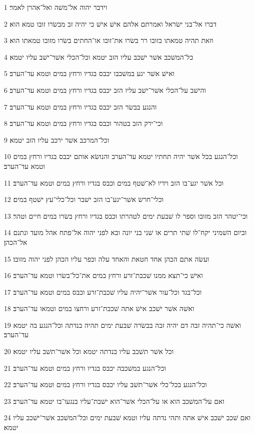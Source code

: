 \par 1 וידבר יהוה אל־משׁה ואל־אהרן לאמר׃
\par 2 דברו אל־בני ישׂראל ואמרתם אלהם אישׁ אישׁ כי יהיה זב מבשׂרו זובו טמא הוא׃
\par 3 וזאת תהיה טמאתו בזובו רר בשׂרו את־זובו או־החתים בשׂרו מזובו טמאתו הוא׃
\par 4 כל־המשׁכב אשׁר ישׁכב עליו הזב יטמא וכל־הכלי אשׁר־ישׁב עליו יטמא׃
\par 5 ואישׁ אשׁר יגע במשׁכבו יכבס בגדיו ורחץ במים וטמא עד־הערב׃
\par 6 והישׁב על־הכלי אשׁר־ישׁב עליו הזב יכבס בגדיו ורחץ במים וטמא עד־הערב׃
\par 7 והנגע בבשׂר הזב יכבס בגדיו ורחץ במים וטמא עד־הערב׃
\par 8 וכי־ירק הזב בטהור וכבס בגדיו ורחץ במים וטמא עד־הערב׃
\par 9 וכל־המרכב אשׁר ירכב עליו הזב יטמא׃
\par 10 וכל־הנגע בכל אשׁר יהיה תחתיו יטמא עד־הערב והנושׂא אותם יכבס בגדיו ורחץ במים וטמא עד־הערב׃
\par 11 וכל אשׁר יגע־בו הזב וידיו לא־שׁטף במים וכבס בגדיו ורחץ במים וטמא עד־הערב׃
\par 12 וכלי־חרשׂ אשׁר־יגע־בו הזב ישׁבר וכל־כלי־עץ ישׁטף במים׃
\par 13 וכי־יטהר הזב מזובו וספר לו שׁבעת ימים לטהרתו וכבס בגדיו ורחץ בשׂרו במים חיים וטהר׃
\par 14 וביום השׁמיני יקח־לו שׁתי תרים או שׁני בני יונה ובא לפני יהוה אל־פתח אהל מועד ונתנם אל־הכהן׃
\par 15 ועשׂה אתם הכהן אחד חטאת והאחד עלה וכפר עליו הכהן לפני יהוה מזובו׃
\par 16 ואישׁ כי־תצא ממנו שׁכבת־זרע ורחץ במים את־כל־בשׂרו וטמא עד־הערב׃
\par 17 וכל־בגד וכל־עור אשׁר־יהיה עליו שׁכבת־זרע וכבס במים וטמא עד־הערב׃
\par 18 ואשׁה אשׁר ישׁכב אישׁ אתה שׁכבת־זרע ורחצו במים וטמאו עד־הערב׃
\par 19 ואשׁה כי־תהיה זבה דם יהיה זבה בבשׂרה שׁבעת ימים תהיה בנדתה וכל־הנגע בה יטמא עד־הערב׃
\par 20 וכל אשׁר תשׁכב עליו בנדתה יטמא וכל אשׁר־תשׁב עליו יטמא׃
\par 21 וכל־הנגע במשׁכבה יכבס בגדיו ורחץ במים וטמא עד־הערב׃
\par 22 וכל־הנגע בכל־כלי אשׁר־תשׁב עליו יכבס בגדיו ורחץ במים וטמא עד־הערב׃
\par 23 ואם על־המשׁכב הוא או על־הכלי אשׁר־הוא ישׁבת־עליו בנגעו־בו יטמא עד־הערב׃
\par 24 ואם שׁכב ישׁכב אישׁ אתה ותהי נדתה עליו וטמא שׁבעת ימים וכל־המשׁכב אשׁר־ישׁכב עליו יטמא׃
